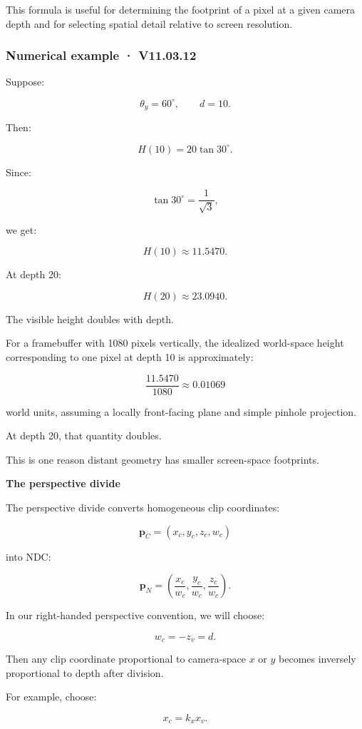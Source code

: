 This formula is useful for determining the footprint of a pixel at a given camera depth and for selecting spatial detail relative to screen resolution.

\subsubsection{Numerical example · V11.03.12}\label{numerical-example-v11.03.12}

Suppose:

\[
 \theta_y=60^\circ, \qquad d=10.
\]

Then:

\[
 H(10)=20\tan30^\circ.
\]

Since:

\[
 \tan30^\circ=\frac1{\sqrt3},
\]

we get:

\[
 \boxed{ H(10)\approx11.5470 }.
\]

At depth 20:

\[
 H(20)\approx23.0940.
\]

The visible height doubles with depth.

For a framebuffer with 1080 pixels vertically, the idealized world-space height corresponding to one pixel at depth 10 is approximately:

\[
 \frac{11.5470}{1080}\approx0.01069
\]

world units, assuming a locally front-facing plane and simple pinhole projection.

At depth 20, that quantity doubles.

This is one reason distant geometry has smaller screen-space footprints.

\textbf{The perspective divide}

The perspective divide converts homogeneous clip coordinates:

\[
 \mathbf p_C= (x_c,y_c,z_c,w_c)
\]

into NDC:

\[
 \boxed{ \mathbf p_N= \left( \frac{x_c}{w_c}, \frac{y_c}{w_c}, \frac{z_c}{w_c} \right) }.
\]

In our right-handed perspective convention, we will choose:

\[
 \boxed{ w_c=-z_v=d }.
\]

Then any clip coordinate proportional to camera-space \(x\) or \(y\) becomes inversely proportional to depth after division.

For example, choose:

\[
 x_c=k_xx_v.
\]

